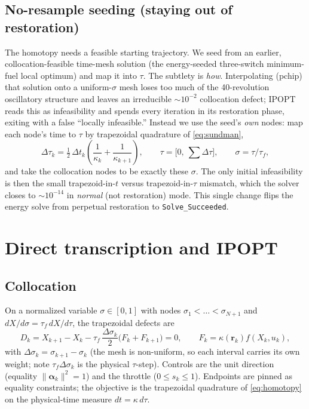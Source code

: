 \documentclass[11pt]{article}
\newcommand{\code}[1]{\texttt{#1}}
\newcommand{\vv}[1]{\boldsymbol{#1}}
\newcommand{\rvec}{\vv{r}}
\newcommand{\dtau}{\,d\tau}
\begin{document}
\subsection{No-resample seeding (staying out of restoration)}
\label{sec:noresample}
The homotopy needs a feasible starting trajectory. We seed from an earlier,
collocation-feasible time-mesh solution (the energy-seeded three-switch
minimum-fuel local optimum) and map it into $\tau$. The subtlety is
\emph{how}. Interpolating (pchip) that solution onto a uniform-$\sigma$ mesh
loses too much of the 40-revolution oscillatory structure and leaves an
irreducible $\sim\!10^{-2}$ collocation defect; IPOPT reads this as
infeasibility and spends every iteration in its restoration phase, exiting with
a false ``locally infeasible.'' Instead we use the seed's \emph{own} nodes:
map each node's time to $\tau$ by trapezoidal quadrature of \eqref{eq:sundman},
\begin{equation}
\Delta\tau_k=\tfrac12\,\Delta t_k\!\left(\frac{1}{\kappa_k}+\frac{1}{\kappa_{k+1}}\right),
\qquad \tau=\Big[0,\ \textstyle\sum\Delta\tau\Big],\qquad
\sigma=\tau/\tau_f,
\end{equation}
and take the collocation nodes to be exactly these $\sigma$. The only initial
infeasibility is then the small trapezoid-in-$t$ versus trapezoid-in-$\tau$
mismatch, which the solver closes to $\sim\!10^{-14}$ in \emph{normal} (not
restoration) mode. This single change flips the energy solve from perpetual
restoration to \code{Solve\_Succeeded}.

\section{Direct transcription and IPOPT}
\label{sec:ipopt}

\subsection{Collocation}
On a normalized variable $\sigma\in[0,1]$ with nodes $\sigma_1<\dots<\sigma_{N+1}$
and $dX/d\sigma=\tau_f\,dX/d\tau$, the trapezoidal defects are
\begin{equation}
D_k=X_{k+1}-X_k-\tau_f\,\frac{\Delta\sigma_k}{2}
\big(F_k+F_{k+1}\big)=0,\qquad F_k=\kappa(\rvec_k)f(X_k,u_k),
\label{eq:defect}
\end{equation}
with $\Delta\sigma_k=\sigma_{k+1}-\sigma_k$ (the mesh is non-uniform, so each
interval carries its own weight; note $\tau_f\Delta\sigma_k$ is the physical
$\tau$-step). Controls are the unit direction (equality
$\lVert\vv\alpha_k\rVert^2=1$) and the throttle ($0\le s_k\le1$). Endpoints are
pinned as equality constraints; the objective is the trapezoidal quadrature of
\eqref{eq:homotopy} on the physical-time measure $dt=\kappa\dtau$.
\end{document}
